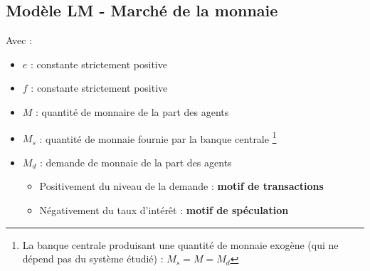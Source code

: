 \subsection{Modèle LM - Marché de la monnaie}
\begin{center}
    \Large{}
\end{center}
Avec : 
\begin{itemize}
    \item $e$ : constante strictement positive
    \item $f$ : constante strictement positive
    \item $M$ : quantité de monnaire de la part des agents
    \item $M_{s}$ : quantité de monnaie fournie par la banque centrale \footnote{La banque centrale produisant une quantité de monnaie exogène (qui ne dépend pas du système étudié) : $M_{s} = M = M_{d}$} 
    \item $M_{d}$ : demande de monnaie de la part des agents 
    \begin{itemize}
        \item Positivement du niveau de la demande : \textbf{motif de transactions}
        \item Négativement du taux d'intérêt : \textbf{motif de spéculation}
    \end{itemize}
\end{itemize}
\begin{center}
    \Large{}
\end{center}
\newpage

